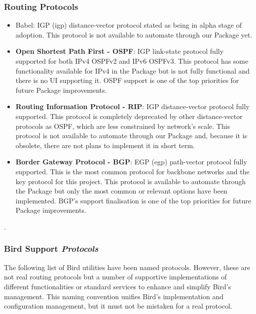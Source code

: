\subsubsection{Routing Protocols}
\begin{itemize}
    \item Babel: IGP (\Gls{igp}) distance-vector protocol stated as being in alpha stage of adoption.
    This protocol is not available to automate through our Package yet.
    \item \textbf{Open Shortest Path First - OSPF}: IGP link-state protocol fully supported for both IPv4 OSPFv2 and IPv6 OSPFv3.
    This protocol has some functionality available for IPv4 in the Package but is not fully functional and there is no UI supporting it. OSPF support is one of the top priorities for future Package improvements.
    \item \textbf{Routing Information Protocol - RIP}: IGP distance-vector protocol fully supported. This protocol is completely deprecated by other distance-vector protocols as OSPF, which are less constrained by network's scale.
    This protocol is not available to automate through our Package and, because it is obsolete, there are not plans to implement it in short term.
    \item \textbf{Border Gateway Protocol - BGP}: EGP (\Gls{egp}) path-vector protocol fully supported. This is the most common protocol for backbone networks and the key protocol for this project.
    This protocol is available to automate through the Package but only the most common or relevant options have been implemented. BGP's support finalisation is one of the top priorities for future Package improvements. 
\end{itemize}.

\subsubsection{Bird Support \textit{Protocols}}
\label{sub:sub:supproto}
The following list of Bird utilities have been named protocols. However, these are not real routing protocols but a number of supportive implementations of different functionalities or standard services to enhance and simplify Bird's management. This naming convention unifies Bird's implementation and configuration management, but it must not be mistaken for a real protocol.

